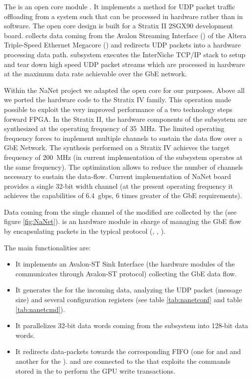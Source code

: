 The  is an open core module \cite{Udp:2009:Online}.
It implements a method for UDP packet traffic offloading from a \nios
system such that can be processed in hardware rather than in
software. The open core design is built for a Stratix II 2SGX90
development board.
 collects data coming from the Avalon Streaming
Interface () of the Altera Triple-Speed Ethernet
Megacore () and redirects UDP packets into a hardware
processing data path.
\nios subsystem executes the InterNiche TCP/IP stack to setup and tear
down high speed UDP packet streams which are processed in hardware at
the maximum data rate achievable over the GbE network.

Within the NaNet project we adapted the open core for our purposes.
Above all we ported the hardware code to the Stratix IV family. This
operation made possible to exploit the very improved performance of a
two technology steps forward FPGA.
In the Stratix II, the hardware components of the \nios subsystem are
synthesized at the operating frequency of 35~MHz. The limited
operating frequency forces to implement multiple channels to sustain
the data flow over a GbE Network.
The synthesis performed on a Stratix IV achieves the target frequency
of 200~MHz (in current implementation of \apenetp the \nios subsystem
operates at the same frequency).
The optimization allows to reduce the number of channels necessary to
sustain the data-flow. Current implementation of NaNet board provides
a single 32-bit width channel (at the present operating frequency it
achieves the capabilities of 6.4~gbps, 6 times greater of the GbE
requirements).


Data coming from the single channel of the modified 
are collected by the  (see figure \ref{fig:NaNet}).
 is an hardware module in charge of managing the GbE
flow by encapsulating packets in the typical \apenetp protocol
(\header, \payload, \footer).

The  main functionalities are:

\begin{itemize}
\item It implements an Avalon-ST Sink Interface (the hardware modules
of the  communicates through Avalon-ST protocol)
collecting the GbE data flow.
\item It generates the \header for the incoming data, analyzing the
UDP packet \header (message size) and several configuration registers
(see table \ref{tab:nanetconf} and table \ref{tab:nanetcmd}).
\item It parallelizes 32-bit data words coming from the \nios
subsystem into 128-bit \apenetp data words.
\item It redirects data-packets towards the corresponding FIFO (one
for \header and \footer and another for the \payload).   and  are connected to the  that exploits the commands stored in the \header to perform the
GPU write transactions.
\end{itemize}

